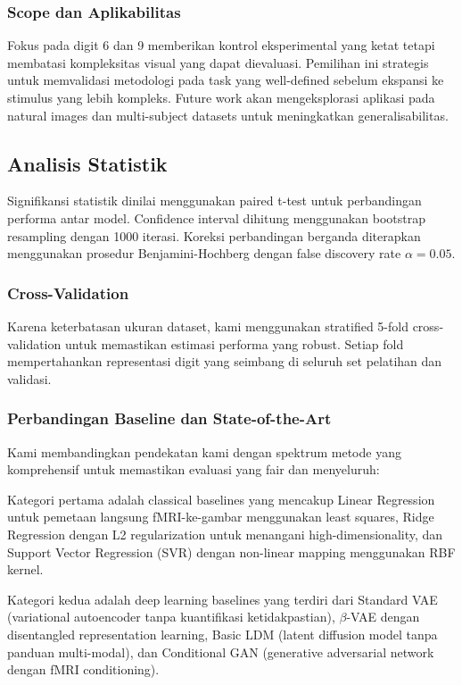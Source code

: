 \subsubsection{Scope dan Aplikabilitas}
Fokus pada digit 6 dan 9 memberikan kontrol eksperimental yang ketat tetapi membatasi kompleksitas visual yang dapat dievaluasi. Pemilihan ini strategis untuk memvalidasi metodologi pada task yang well-defined sebelum ekspansi ke stimulus yang lebih kompleks. Future work akan mengeksplorasi aplikasi pada natural images dan multi-subject datasets untuk meningkatkan generalisabilitas.

\subsection{Analisis Statistik}

Signifikansi statistik dinilai menggunakan paired t-test untuk perbandingan performa antar model. Confidence interval dihitung menggunakan bootstrap resampling dengan 1000 iterasi. Koreksi perbandingan berganda diterapkan menggunakan prosedur Benjamini-Hochberg dengan false discovery rate $\alpha = 0.05$.

\subsubsection{Cross-Validation}
Karena keterbatasan ukuran dataset, kami menggunakan stratified 5-fold cross-validation untuk memastikan estimasi performa yang robust. Setiap fold mempertahankan representasi digit yang seimbang di seluruh set pelatihan dan validasi.

\subsubsection{Perbandingan Baseline dan State-of-the-Art}
Kami membandingkan pendekatan kami dengan spektrum metode yang komprehensif untuk memastikan evaluasi yang fair dan menyeluruh:

Kategori pertama adalah classical baselines yang mencakup Linear Regression untuk pemetaan langsung fMRI-ke-gambar menggunakan least squares, Ridge Regression dengan L2 regularization untuk menangani high-dimensionality, dan Support Vector Regression (SVR) dengan non-linear mapping menggunakan RBF kernel.

Kategori kedua adalah deep learning baselines yang terdiri dari Standard VAE (variational autoencoder tanpa kuantifikasi ketidakpastian), $\beta$-VAE dengan disentangled representation learning, Basic LDM (latent diffusion model tanpa panduan multi-modal), dan Conditional GAN (generative adversarial network dengan fMRI conditioning).

